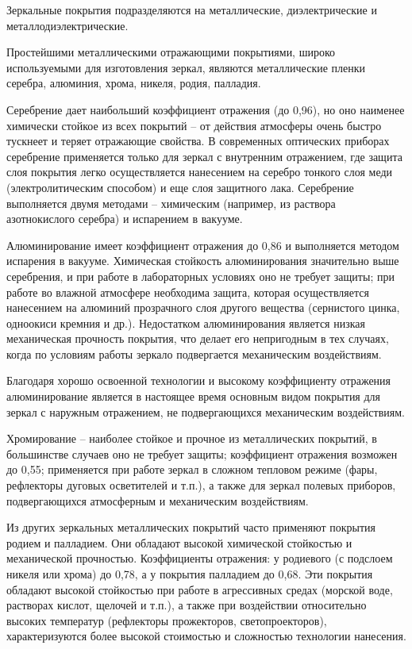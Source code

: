 \begin{enumerate}[leftmargin=*]
Зеркальные покрытия подразделяются на металлические, диэлектрические и металлодиэлектрические.

Простейшими металлическими отражающими покрытиями, широко используемыми для изготовления зеркал, являются металлические пленки серебра, алюминия, хрома, никеля, родия, палладия.

Серебрение дает наибольший коэффициент отражения (до 0,96), но оно наименее химически стойкое из всех покрытий -- от действия атмосферы очень быстро тускнеет и теряет отражающие свойства. В современных оптических приборах серебрение применяется только для зеркал с внутренним отражением, где защита слоя покрытия легко осуществляется нанесением на серебро тонкого слоя меди (электролитическим способом) и еще слоя защитного лака. Серебрение выполняется двумя методами -- химическим (например, из раствора азотнокислого серебра) и испарением в вакууме.

Алюминирование имеет коэффициент отражения до 0,86 и выполняется методом испарения в вакууме. Химическая стойкость алюминирования значительно выше серебрения, и при работе в лабораторных условиях оно не требует защиты; при работе во влажной атмосфере необходима защита, которая осуществляется нанесением на алюминий прозрачного слоя другого вещества (сернистого цинка, одноокиси кремния и др.). Недостатком алюминирования является низкая механическая прочность покрытия, что делает его непригодным в тех случаях, когда по условиям работы зеркало подвергается механическим воздействиям.

Благодаря хорошо освоенной технологии и высокому коэффициенту отражения алюминирование является в настоящее время основным видом покрытия для зеркал с наружным отражением, не подвергающихся механическим воздействиям.

Хромирование -- наиболее стойкое и прочное из металлических покрытий, в большинстве случаев оно не требует защиты; коэффициент отражения возможен до 0,55; применяется при работе зеркал в сложном тепловом режиме (фары, рефлекторы дуговых осветителей и т.п.), а также для зеркал полевых приборов, подвергающихся атмосферным и механическим воздействиям.

Из других зеркальных металлических покрытий часто применяют покрытия родием и палладием. Они обладают высокой химической стойкостью и механической прочностью. Коэффициенты отражения: у родиевого (с подслоем никеля или хрома) до 0,78, а у покрытия палладием до 0,68. Эти покрытия обладают высокой стойкостью при работе в агрессивных средах (морской воде, растворах кислот, щелочей и т.п.), а также при воздействии относительно высоких температур (рефлекторы прожекторов, светопроекторов), характеризуются более высокой стоимостью и сложностью технологии нанесения.


\end{enumerate}

